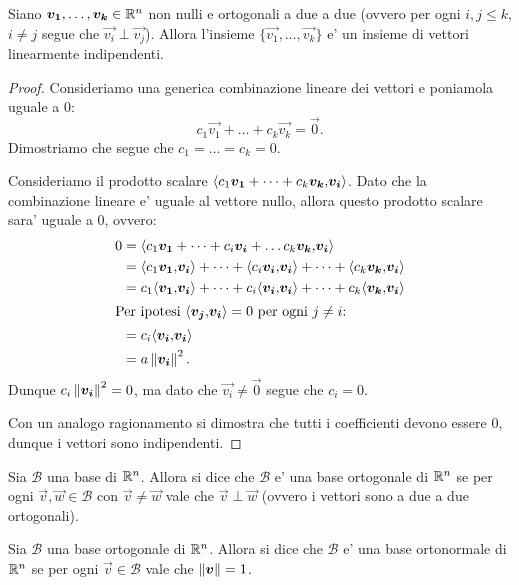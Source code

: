 \begin{corollary}
    \label{ortogonali=>indip_n}
    Siano $\bm{v_1}, \dots, \bm{v_k} \in \mathbb{R}^n$ non nulli e ortogonali a due a due (ovvero per ogni $i, j \leq k$, $i \neq j$ segue che $\vec{v_i} \perp \vec{v_j}$). Allora l'insieme $\{\vec{v_1}, \dots, \vec{v_k}\}$ e' un insieme di vettori linearmente indipendenti.
\end{corollary}
\begin{proof}
    Consideriamo una generica combinazione lineare dei vettori e poniamola uguale a $0$: \[
        c_1\vec{v_1} + \dots + c_k\vec{v_k} = \vec 0. 
    \] Dimostriamo che segue che $c_1 = \dots = c_k = 0$.

    Consideriamo il prodotto scalare $\langle c_1\bm{v_1} + \dots + c_k\bm{v_k}{,}\bm{v_i}\rangle$. Dato che la combinazione lineare e' uguale al vettore nullo, allora questo prodotto scalare sara' uguale a 0, ovvero:
    \begin{align*}
        0 &= \langle c_1\bm{v_1} + \dots + c_i\bm{v_i} + \dots c_k\bm{v_k}{,}\bm{v_i}\rangle \\
        &= \langle c_1\bm{v_1}{,}\bm{v_i}\rangle + \dots + \langle c_i\bm{v_i}{,}\bm{v_i}\rangle + \dots + \langle c_k\bm{v_k}{,}\bm{v_i}\rangle \\
        &= c_1\langle \bm{v_1}{,}\bm{v_i}\rangle + \dots + c_i\langle \bm{v_i}{,}\bm{v_i}\rangle + \dots + c_k\langle \bm{v_k}{,}\bm{v_i}\rangle \\
        \intertext{Per ipotesi $\langle \bm{v_j}{,}\bm{v_i}\rangle = 0$ per ogni $j \neq i$:} 
        &= c_i\langle \bm{v_i}{,}\bm{v_i}\rangle \\
        &= a\left\lVert\bm{v_i}\right\rVert^2.
    \end{align*}
    Dunque $c_i\left\lVert\bm{v_i}\right\rVert^2 = 0$, ma dato che $\vec{v_i} \neq \vec 0$ segue che $c_i = 0$.

    Con un analogo ragionamento si dimostra che tutti i coefficienti devono essere $0$, dunque i vettori sono indipendenti.
\end{proof}

\begin{definition}
    Sia $\mathcal{B}$ una base di $\mathbb{R}^n$. Allora si dice che $\mathcal{B}$ e' una base ortogonale di $\mathbb{R}^n$ se per ogni $\vec v, \vec w \in \mathcal{B}$ con $\vec v \neq \vec w$ vale che $\vec v \perp \vec w$ (ovvero i vettori sono a due a due ortogonali).
\end{definition}

\begin{definition}
    Sia $\mathcal{B}$ una base ortogonale di $\mathbb{R}^n$. Allora si dice che $\mathcal{B}$ e' una base ortonormale di $\mathbb{R}^n$ se per ogni $\vec v \in \mathcal{B}$ vale che $\left\lVert\bm{v}\right\rVert = 1$.
\end{definition}

